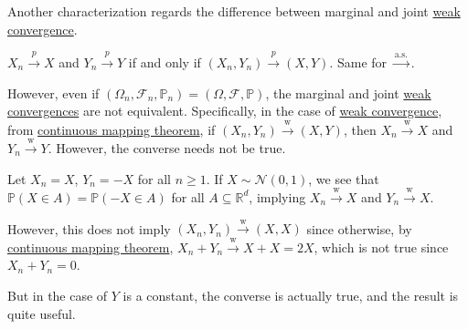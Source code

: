 Another characterization regards the difference between marginal and joint \hyperref[def:converge-weakly]{weak convergence}.

\begin{prev}
	\(X_n \overset{p}{\to } X\) and \(Y_n \overset{p}{\to } Y\) if and only if \((X_n , Y_n) \overset{p}{\to } (X, Y)\). Same for \(\overset{\text{a.s.} }{\to} \).
\end{prev}

However, even if \((\Omega _n, \mathscr{F} _n, \mathbb{P} _n) = (\Omega , \mathscr{F} , \mathbb{P} )\), the marginal and joint \hyperref[def:converge-weakly]{weak convergences} are not equivalent. Specifically, in the case of \hyperref[def:converge-weakly]{weak convergence}, from \hyperref[thm:continuous-mapping]{continuous mapping theorem}, if \((X_n , Y_n) \overset{\text{w} }{\to } (X, Y)\), then \(X_n \overset{\text{w} }{\to } X\) and \(Y_n \overset{\text{w} }{\to } Y\). However, the converse needs not be true.

\begin{eg}\label{eg:counter-example-continuous-mapping}
	Let \(X_n = X\), \(Y_n = -X\) for all \(n \geq 1\). If \(X \sim \mathcal{N} (0, 1)\), we see that \(\mathbb{P} (X \in A) = \mathbb{P} (-X \in A)\) for all \(A \subseteq \mathbb{R} ^d\), implying \(X_n \overset{\text{w} }{\to } X\) and \(Y_n \overset{\text{w} }{\to } X\).

	However, this does not imply \((X_n , Y_n) \overset{\text{w} }{\to } (X, X)\) since otherwise, by \hyperref[thm:continuous-mapping]{continuous mapping theorem}, \(X_n + Y_n \overset{\text{w} }{\to } X + X = 2X\), which is not true since \(X_n + Y_n = 0\).
\end{eg}

But in the case of \(Y\) is a constant, the converse is actually true, and the result is quite useful.

